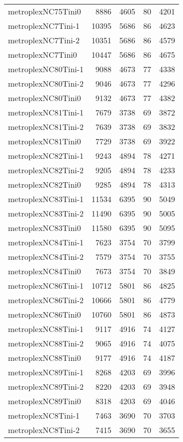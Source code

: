 \begin{longtable}{lrrrr}
metroplexNC75Tini0 & 8886 & 4605 & 80 & 4201 \\
metroplexNC7Tini-1 & 10395 & 5686 & 86 & 4623 \\
metroplexNC7Tini-2 & 10351 & 5686 & 86 & 4579 \\
metroplexNC7Tini0 & 10447 & 5686 & 86 & 4675 \\
metroplexNC80Tini-1 & 9088 & 4673 & 77 & 4338 \\
metroplexNC80Tini-2 & 9046 & 4673 & 77 & 4296 \\
metroplexNC80Tini0 & 9132 & 4673 & 77 & 4382 \\
metroplexNC81Tini-1 & 7679 & 3738 & 69 & 3872 \\
metroplexNC81Tini-2 & 7639 & 3738 & 69 & 3832 \\
metroplexNC81Tini0 & 7729 & 3738 & 69 & 3922 \\
metroplexNC82Tini-1 & 9243 & 4894 & 78 & 4271 \\
metroplexNC82Tini-2 & 9205 & 4894 & 78 & 4233 \\
metroplexNC82Tini0 & 9285 & 4894 & 78 & 4313 \\
metroplexNC83Tini-1 & 11534 & 6395 & 90 & 5049 \\
metroplexNC83Tini-2 & 11490 & 6395 & 90 & 5005 \\
metroplexNC83Tini0 & 11580 & 6395 & 90 & 5095 \\
metroplexNC84Tini-1 & 7623 & 3754 & 70 & 3799 \\
metroplexNC84Tini-2 & 7579 & 3754 & 70 & 3755 \\
metroplexNC84Tini0 & 7673 & 3754 & 70 & 3849 \\
metroplexNC86Tini-1 & 10712 & 5801 & 86 & 4825 \\
metroplexNC86Tini-2 & 10666 & 5801 & 86 & 4779 \\
metroplexNC86Tini0 & 10760 & 5801 & 86 & 4873 \\
metroplexNC88Tini-1 & 9117 & 4916 & 74 & 4127 \\
metroplexNC88Tini-2 & 9065 & 4916 & 74 & 4075 \\
metroplexNC88Tini0 & 9177 & 4916 & 74 & 4187 \\
metroplexNC89Tini-1 & 8268 & 4203 & 69 & 3996 \\
metroplexNC89Tini-2 & 8220 & 4203 & 69 & 3948 \\
metroplexNC89Tini0 & 8318 & 4203 & 69 & 4046 \\
metroplexNC8Tini-1 & 7463 & 3690 & 70 & 3703 \\
metroplexNC8Tini-2 & 7415 & 3690 & 70 & 3655 \\

\end{longtable}
